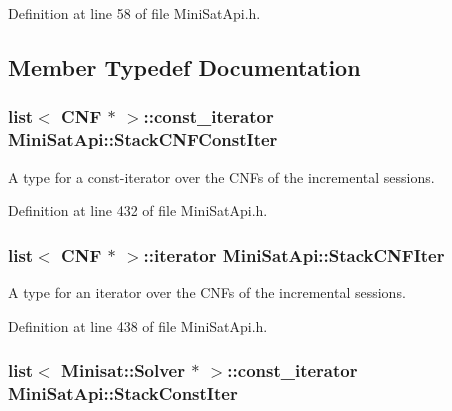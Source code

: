 Definition at line 58 of file Mini\-Sat\-Api.\-h.



\subsection{Member Typedef Documentation}
\hypertarget{classMiniSatApi_a1d7b9074d64167fb10552e58a9a84ddb}{
\subsubsection[{Stack\-C\-N\-F\-Const\-Iter}]{\setlength{\rightskip}{0pt plus 5cm}list$<$ {\bf C\-N\-F} $\ast$ $>$\-::const\-\_\-iterator {\bf Mini\-Sat\-Api\-::\-Stack\-C\-N\-F\-Const\-Iter}\hspace{0.3cm}{\ttfamily [protected]}}}\label{classMiniSatApi_a1d7b9074d64167fb10552e58a9a84ddb}


A type for a const-\/iterator over the C\-N\-Fs of the incremental sessions. 



Definition at line 432 of file Mini\-Sat\-Api.\-h.

\hypertarget{classMiniSatApi_a12ef23c063731cbdb7405de0e670f6a7}{
\subsubsection[{Stack\-C\-N\-F\-Iter}]{\setlength{\rightskip}{0pt plus 5cm}list$<$ {\bf C\-N\-F} $\ast$ $>$\-::iterator {\bf Mini\-Sat\-Api\-::\-Stack\-C\-N\-F\-Iter}\hspace{0.3cm}{\ttfamily [protected]}}}\label{classMiniSatApi_a12ef23c063731cbdb7405de0e670f6a7}


A type for an iterator over the C\-N\-Fs of the incremental sessions. 



Definition at line 438 of file Mini\-Sat\-Api.\-h.

\hypertarget{classMiniSatApi_aa4c233a841e489de9a59622e18df4678}{
\subsubsection[{Stack\-Const\-Iter}]{\setlength{\rightskip}{0pt plus 5cm}list$<$ Minisat\-::\-Solver $\ast$ $>$\-::const\-\_\-iterator {\bf Mini\-Sat\-Api\-::\-Stack\-Const\-Iter}\hspace{0.3cm}{\ttfamily [protected]}}}\label{classMiniSatApi_aa4c233a841e489de9a59622e18df4678}


